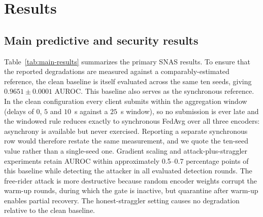 \documentclass[pdflatex,sn-mathphys-num]{sn-jnl}
\begin{document}
\section{Results}\label{sec:results}

\subsection{Main predictive and security results}

Table~\ref{tab:main-results} summarizes the primary SNAS results. To ensure that the reported degradations are measured against a comparably-estimated reference, the clean baseline is itself evaluated across the same ten seeds, giving $0.9651\pm0.0001$ AUROC. This baseline also serves as the synchronous reference. In the clean configuration every client submits within the aggregation window (delays of $0$, $5$ and $10$~s against a $25$~s window), so no submission is ever late and the windowed rule reduces exactly to synchronous FedAvg over all three encoders: asynchrony is available but never exercised. Reporting a separate synchronous row would therefore restate the same measurement, and we quote the ten-seed value rather than a single-seed one. Gradient scaling and attack-plus-straggler experiments retain AUROC within approximately 0.5--0.7 percentage points of this baseline while detecting the attacker in all evaluated detection rounds. The free-rider attack is more destructive because random encoder weights corrupt the warm-up rounds, during which the gate is inactive, but quarantine after warm-up enables partial recovery. The honest-straggler setting causes no degradation relative to the clean baseline.
\end{document}
